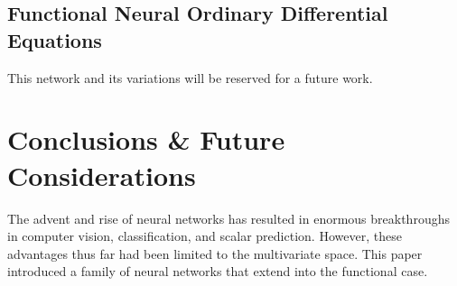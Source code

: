\documentclass{article}
\begin{document}







\subsection{Functional Neural Ordinary Differential Equations}

\noindent This network and its variations will be reserved for a future work.

\section{Conclusions \& Future Considerations}

\noindent The advent and rise of neural networks has resulted in enormous breakthroughs in computer vision, classification, and scalar prediction. However, these advantages thus far had been limited to the multivariate space. This paper introduced a family of neural networks that extend into the functional case. 
\end{document}
